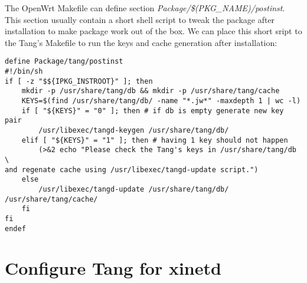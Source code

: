 The OpenWrt Makefile can define section {\it Package/\$(PKG\_NAME)/postinst}.
This section usually contain a short shell script to tweak the package after installation to make package work out of the box.
We can place this short sript to the Tang's Makefile to run the keys and cache generation after installation:
\begin{lstlisting}[columns=fixed,basicstyle=\ttfamily\footnotesize,tabsize=4,backgroundcolor=\color{yellow!10}]
define Package/tang/postinst
#!/bin/sh
if [ -z "$${IPKG_INSTROOT}" ]; then
	mkdir -p /usr/share/tang/db && mkdir -p /usr/share/tang/cache
	KEYS=$(find /usr/share/tang/db/ -name "*.jw*" -maxdepth 1 | wc -l)
	if [ "${KEYS}" = "0" ]; then # if db is empty generate new key pair
		/usr/libexec/tangd-keygen /usr/share/tang/db/
	elif [ "${KEYS}" = "1" ]; then # having 1 key should not happen
		(>&2 echo "Please check the Tang's keys in /usr/share/tang/db \
and regenate cache using /usr/libexec/tangd-update script.")
	else
		/usr/libexec/tangd-update /usr/share/tang/db/ /usr/share/tang/cache/
	fi
fi
endef
\end{lstlisting}



\section{Configure Tang for xinetd}


